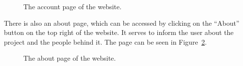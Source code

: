 \begin{figure}[H]
    \centering
    \setlength{\fboxsep}{0pt}
    \caption{The account page of the website.}\label{fig:account}
\end{figure}

There is also an about page, which can be accessed by clicking on the ``About'' button on the top right of the
website.
It serves to inform the user about the project and the people behind it.
The page can be seen in Figure~\ref{fig:about}.

\begin{figure}[H]
    \centering
    \setlength{\fboxsep}{0pt}
    \caption{The about page of the website.}\label{fig:about}
\end{figure}
